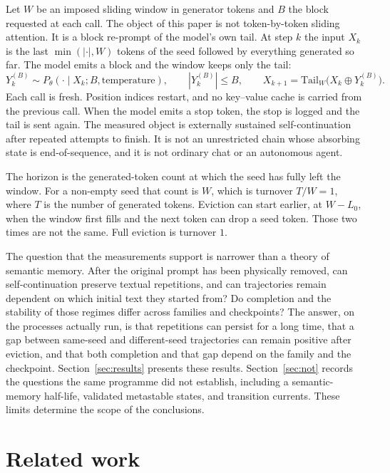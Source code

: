 \documentclass[10pt]{article}
\begin{document}
Let $W$ be an imposed sliding window in generator tokens and $B$ the
block requested at each call.
The object of this paper is not token-by-token sliding attention.
It is a block re-prompt of the model's own tail.
At step $k$ the input $X_k$ is the last $\min(|\cdot|, W)$ tokens of
the seed followed by everything generated so far.
The model emits a block and the window keeps only the tail:
\begin{equation}
  Y_k^{(B)}\sim P_\theta(\cdot\mid X_k; B,\text{temperature}),\qquad
  |Y_k^{(B)}|\le B,\qquad
  X_{k+1}=\mathrm{Tail}_W\bigl(X_k\oplus Y_k^{(B)}\bigr).
  \label{eq:kernel}
\end{equation}
Each call is fresh.
Position indices restart, and no key--value cache is carried from the
previous call.
When the model emits a stop token, the stop is logged and the tail is
sent again.
The measured object is externally sustained self-continuation after
repeated attempts to finish.
It is not an unrestricted chain whose absorbing state is end-of-sequence,
and it is not ordinary chat or an autonomous agent.

The horizon is the generated-token count at which the seed has fully
left the window.
For a non-empty seed that count is $W$, which is turnover $T/W = 1$,
where $T$ is the number of generated tokens.
Eviction can start earlier, at $W-L_0$, when the window first fills and
the next token can drop a seed token.
Those two times are not the same.
Full eviction is turnover $1$.

The question that the measurements support is narrower than a theory of
semantic memory.
After the original prompt has been physically removed, can
self-continuation preserve textual repetitions, and can trajectories
remain dependent on which initial text they started from?
Do completion and the stability of those regimes differ across families
and checkpoints?
The answer, on the processes actually run, is that repetitions can
persist for a long time, that a gap between same-seed and different-seed
trajectories can remain positive after eviction, and that both
completion and that gap depend on the family and the checkpoint.
Section~\ref{sec:results} presents these results.
Section~\ref{sec:not} records the questions the same programme did not
establish, including a semantic-memory half-life, validated metastable
states, and transition currents.
These limits determine the scope of the conclusions.

\section{Related work}
\label{sec:related}
\end{document}
